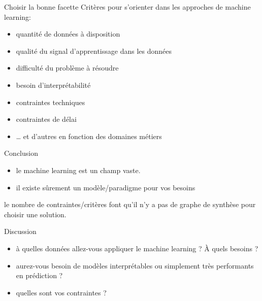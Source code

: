 \begin{frame}{Choisir la bonne facette}
  Critères pour s'orienter dans les approches de machine learning:
  \begin{itemize}[<+->]
  \item quantité de données à disposition
  \item qualité du signal d'apprentissage dans les données
  \item difficulté du problème à résoudre
  \item besoin d'interprétabilité
  \item contraintes techniques
  \item contraintes de délai
  \item … et d'autres en fonction des domaines métiers
  \end{itemize}
\end{frame}

\begin{frame}{Conclusion}
  \begin{itemize}
  \item le machine learning est un champ vaste.
  \item il existe sûrement un modèle/paradigme pour vos besoins
  \end{itemize}
  le nombre de contraintes/critères font qu'il n'y a pas de graphe de synthèse pour choisir une solution.
\end{frame}

\begin{frame}{Discussion}
  \begin{itemize}
  \item à quelles données allez-vous appliquer le machine learning ? À
    quels besoins ?
  \item aurez-vous besoin de modèles interprétables ou simplement très
    performants en prédiction ?
  \item quelles sont vos contraintes ?
  \end{itemize}
\end{frame}



